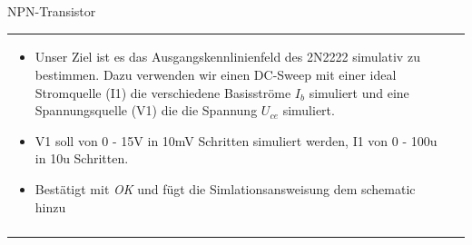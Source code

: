 \begin{frame}[t]{NPN-Transistor}
\begin{spacing}{0.9}
\begin{tiny}
\begin{table}[h!]
\begin{tabular}{p{3cm} p{7cm}}
\begin{minipage}{.7\textwidth}
\begin{itemize}
              \item Unser Ziel ist es das Ausgangskennlinienfeld des 2N2222 simulativ zu bestimmen. Dazu verwenden wir einen DC-Sweep
                    mit einer ideal Stromquelle (I1) die verschiedene Basisströme $I_b$ simuliert und eine Spannungsquelle (V1) die die Spannung
                    $U_{ce}$ simuliert.
              \item V1 soll von 0 - 15V in 10mV Schritten simuliert werden, I1 von 0 - 100u in 10u Schritten.
              \item Bestätigt mit \textit{OK} und fügt die Simlationsansweisung dem schematic hinzu
            \end{itemize}
          \end{minipage}
          \\
                                                & \\
          \hline
        \end{tabular}

      \end{table}

    \end{tiny} \end{spacing}

\end{frame}

